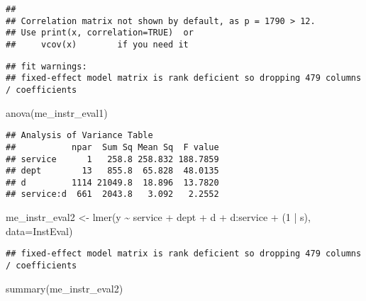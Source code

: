 \documentclass[
]{article}
\newenvironment{Shaded}{\begin{snugshade}}{\end{snugshade}}
\newcommand{\AttributeTok}[1]{\textcolor[rgb]{0.77,0.63,0.00}{#1}}
\newcommand{\DecValTok}[1]{\textcolor[rgb]{0.00,0.00,0.81}{#1}}
\newcommand{\FunctionTok}[1]{\textcolor[rgb]{0.00,0.00,0.00}{#1}}
\newcommand{\NormalTok}[1]{#1}
\newcommand{\OtherTok}[1]{\textcolor[rgb]{0.56,0.35,0.01}{#1}}
\newcommand{\SpecialCharTok}[1]{\textcolor[rgb]{0.00,0.00,0.00}{#1}}
\begin{document}
\begin{verbatim}
## 
## Correlation matrix not shown by default, as p = 1790 > 12.
## Use print(x, correlation=TRUE)  or
##     vcov(x)        if you need it
\end{verbatim}

\begin{verbatim}
## fit warnings:
## fixed-effect model matrix is rank deficient so dropping 479 columns / coefficients
\end{verbatim}

\begin{Shaded}
\begin{Highlighting}[]
\FunctionTok{anova}\NormalTok{(me\_instr\_eval1)}
\end{Highlighting}
\end{Shaded}

\begin{verbatim}
## Analysis of Variance Table
##           npar  Sum Sq Mean Sq  F value
## service      1   258.8 258.832 188.7859
## dept        13   855.8  65.828  48.0135
## d         1114 21049.8  18.896  13.7820
## service:d  661  2043.8   3.092   2.2552
\end{verbatim}

\begin{Shaded}
\begin{Highlighting}[]
\NormalTok{me\_instr\_eval2 }\OtherTok{\textless{}{-}} \FunctionTok{lmer}\NormalTok{(y }\SpecialCharTok{\textasciitilde{}}\NormalTok{ service }\SpecialCharTok{+}\NormalTok{ dept }\SpecialCharTok{+}\NormalTok{ d }\SpecialCharTok{+}\NormalTok{ d}\SpecialCharTok{:}\NormalTok{service }\SpecialCharTok{+}\NormalTok{ (}\DecValTok{1} \SpecialCharTok{|}\NormalTok{ s), }\AttributeTok{data=}\NormalTok{InstEval)}
\end{Highlighting}
\end{Shaded}

\begin{verbatim}
## fixed-effect model matrix is rank deficient so dropping 479 columns / coefficients
\end{verbatim}

\begin{Shaded}
\begin{Highlighting}[]
\FunctionTok{summary}\NormalTok{(me\_instr\_eval2)}
\end{Highlighting}
\end{Shaded}
\end{document}
